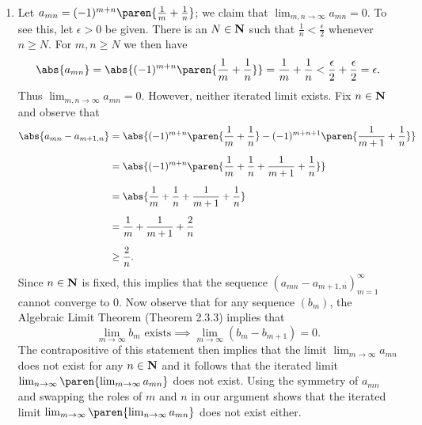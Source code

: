 \documentclass{lew98_solutions}
\begin{document}
\begin{solution}
\begin{enumerate}
        \item Let \( a_{mn} = (-1)^{m + n} \paren{ \frac{1}{m} + \frac{1}{n} } \); we claim that \( \lim_{m, n \to \infty} a_{mn} = 0 \). To see this, let \( \epsilon > 0 \) be given. There is an \( N \in \mathbf{N} \) such that \( \tfrac{1}{n} < \tfrac{\epsilon}{2} \) whenever \( n \geq N \). For \( m, n \geq N \) we then have
        \[
            \abs{a_{mn}} = \abs{(-1)^{m + n} \paren{ \frac{1}{m} + \frac{1}{n} }} = \frac{1}{m} + \frac{1}{n} < \frac{\epsilon}{2} + \frac{\epsilon}{2} = \epsilon.
        \]
        Thus \( \lim_{m, n \to \infty} a_{mn} = 0 \). However, neither iterated limit exists. Fix \( n \in \mathbf{N} \) and observe that
        \begin{align*}
            \abs{a_{mn} - a_{m+1,n}} &= \abs{(-1)^{m + n} \paren{ \frac{1}{m} + \frac{1}{n} } - (-1)^{m + n + 1} \paren{ \frac{1}{m + 1} + \frac{1}{n} }} \\[2mm]
            &= \abs{ (-1)^{m + n} \paren{ \frac{1}{m} + \frac{1}{n} + \frac{1}{m + 1} + \frac{1}{n} } } \\[2mm]
            &= \abs{\frac{1}{m} + \frac{1}{n} + \frac{1}{m + 1} + \frac{1}{n}} \\[2mm]
            &= \frac{1}{m} + \frac{1}{m + 1} + \frac{2}{n} \\[2mm]
            &\geq \frac{2}{n}.
        \end{align*}
        Since \( n \in \mathbf{N} \) is fixed, this implies that the sequence \( (a_{mn} - a_{m+1,n})_{m=1}^{\infty} \) cannot converge to \( 0 \). Now observe that for any sequence \( (b_m) \), the Algebraic Limit Theorem (Theorem 2.3.3) implies that
        \[
            \lim_{m \to \infty} b_m \text{ exists} \implies \lim_{m \to \infty} (b_m - b_{m+1}) = 0.
        \]
        The contrapositive of this statement then implies that the limit \( \lim_{m \to \infty} a_{mn} \) does not exist for any \( n \in \mathbf{N} \) and it follows that the iterated limit \( \lim_{n \to \infty} \paren{ \lim_{m \to \infty} a_{mn} } \) does not exist. Using the symmetry of \( a_{mn} \) and swapping the roles of \( m \) and \( n \) in our argument shows that the iterated limit \( \lim_{m \to \infty} \paren{ \lim_{n \to \infty} a_{mn} } \) does not exist either.


\end{enumerate}
\end{solution}
\end{document}
